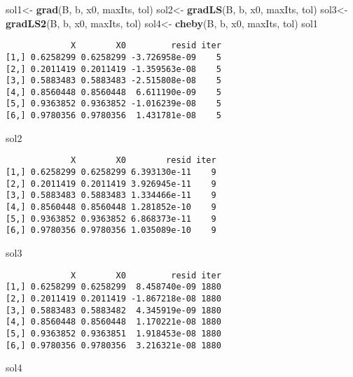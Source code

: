 \documentclass[]{article}
\newenvironment{Shaded}{\begin{snugshade}}{\end{snugshade}}
\newcommand{\KeywordTok}[1]{\textcolor[rgb]{0.13,0.29,0.53}{\textbf{#1}}}
\newcommand{\StringTok}[1]{\textcolor[rgb]{0.31,0.60,0.02}{#1}}
\newcommand{\NormalTok}[1]{#1}
\begin{document}
\begin{Shaded}
\begin{Highlighting}[]
\NormalTok{sol1<-}\StringTok{ }\KeywordTok{grad}\NormalTok{(B, b, x0, maxIts, tol)}
\NormalTok{sol2<-}\StringTok{ }\KeywordTok{gradLS}\NormalTok{(B, b, x0, maxIts, tol)}
\NormalTok{sol3<-}\StringTok{ }\KeywordTok{gradLS2}\NormalTok{(B, b, x0, maxIts, tol)}
\NormalTok{sol4<-}\StringTok{ }\KeywordTok{cheby}\NormalTok{(B, b, x0, maxIts, tol)}
\NormalTok{sol1}
\end{Highlighting}
\end{Shaded}

\begin{verbatim}
             X        X0         resid iter
[1,] 0.6258299 0.6258299 -3.726958e-09    5
[2,] 0.2011419 0.2011419 -1.359563e-08    5
[3,] 0.5883483 0.5883483 -2.515808e-08    5
[4,] 0.8560448 0.8560448  6.611190e-09    5
[5,] 0.9363852 0.9363852 -1.016239e-08    5
[6,] 0.9780356 0.9780356  1.431781e-08    5
\end{verbatim}

\begin{Shaded}
\begin{Highlighting}[]
\NormalTok{sol2}
\end{Highlighting}
\end{Shaded}

\begin{verbatim}
             X        X0        resid iter
[1,] 0.6258299 0.6258299 6.393130e-11    9
[2,] 0.2011419 0.2011419 3.926945e-11    9
[3,] 0.5883483 0.5883483 1.334466e-11    9
[4,] 0.8560448 0.8560448 1.281852e-10    9
[5,] 0.9363852 0.9363852 6.868373e-11    9
[6,] 0.9780356 0.9780356 1.035089e-10    9
\end{verbatim}

\begin{Shaded}
\begin{Highlighting}[]
\NormalTok{sol3}
\end{Highlighting}
\end{Shaded}

\begin{verbatim}
             X        X0         resid iter
[1,] 0.6258299 0.6258299  8.458740e-09 1880
[2,] 0.2011419 0.2011419 -1.867218e-08 1880
[3,] 0.5883483 0.5883482  4.345919e-09 1880
[4,] 0.8560448 0.8560448  1.170221e-08 1880
[5,] 0.9363852 0.9363851  1.918453e-08 1880
[6,] 0.9780356 0.9780356  3.216321e-08 1880
\end{verbatim}

\begin{Shaded}
\begin{Highlighting}[]
\NormalTok{sol4}
\end{Highlighting}
\end{Shaded}
\end{document}
